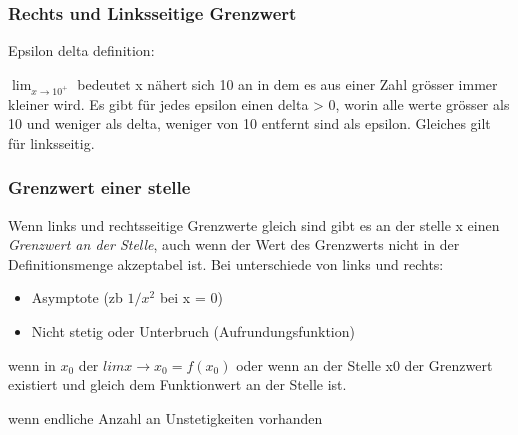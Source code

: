 \subsubsection{Rechts und Linksseitige Grenzwert}

Epsilon delta definition: 

$\lim_{x \rightarrow 10^+}$ bedeutet x nähert sich 10 an in dem es aus einer Zahl grösser immer kleiner wird. Es gibt für jedes epsilon einen delta > 0, worin alle werte grösser als 10 und weniger als delta, weniger von 10 entfernt sind als epsilon. Gleiches gilt für linksseitig.

\subsubsection{Grenzwert einer stelle}

Wenn links und rechtsseitige Grenzwerte gleich sind gibt es an der stelle x einen \textit{Grenzwert an der Stelle}, auch wenn der Wert des Grenzwerts nicht in der Definitionsmenge akzeptabel ist.
Bei unterschiede von links und rechts:
\begin{itemize}
    \item Asymptote (zb $1/x^2$ bei x = 0)
    \item Nicht stetig oder Unterbruch (Aufrundungsfunktion)
\end{itemize}

\begin{definition}
     wenn in $x_0$ der $lim{x\rightarrow x_0} = f(x_0)$ oder wenn an der Stelle x0 der Grenzwert existiert und gleich dem Funktionwert an der Stelle ist.
\end{definition}

\begin{definition}
     wenn endliche Anzahl an Unstetigkeiten vorhanden 
\end{definition}